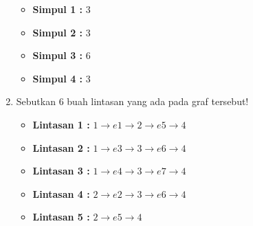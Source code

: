 \documentclass[12pt,titlepage]{article}
\begin{document}
\begin{enumerate}[label=\alph*.)]
{        \begin{itemize}
            \item \textbf{Simpul 1 :} 3
            \item \textbf{Simpul 2 :} 3
            \item \textbf{Simpul 3 :} 6
            \item \textbf{Simpul 4 :} 3
        \end{itemize}
    }
    \item {
        Sebutkan 6 buah lintasan yang ada pada graf tersebut!

        \begin{itemize}
            \item \textbf{Lintasan 1 :} $1 \rightarrow e1 \rightarrow 2 \rightarrow e5 \rightarrow 4$
            \item \textbf{Lintasan 2 :} $1 \rightarrow e3 \rightarrow 3 \rightarrow e6 \rightarrow 4$
            \item \textbf{Lintasan 3 :} $1 \rightarrow e4 \rightarrow 3 \rightarrow e7 \rightarrow 4$
            \item \textbf{Lintasan 4 :} $2 \rightarrow e2 \rightarrow 3 \rightarrow e6 \rightarrow 4$
            \item \textbf{Lintasan 5 :} $2 \rightarrow e5 \rightarrow 4$
        \end{itemize}
    }
\end{enumerate}
\end{document}
